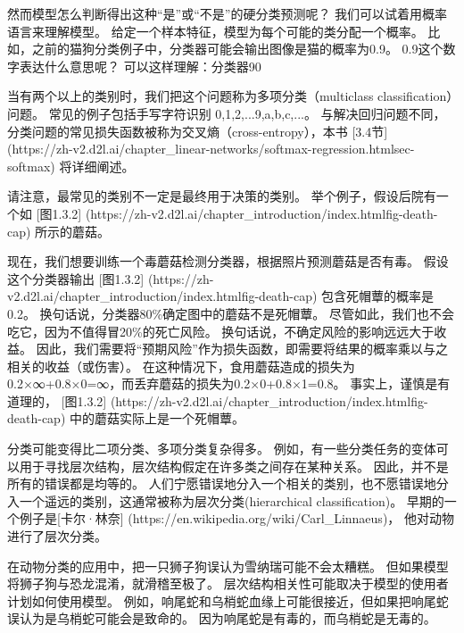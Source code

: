 然而模型怎么判断得出这种“是”或“不是”的硬分类预测呢？ 我们可以试着用概率语言来理解模型。 给定一个样本特征，模型为每个可能的类分配一个概率。 比如，之前的猫狗分类例子中，分类器可能会输出图像是猫的概率为0.9。 0.9这个数字表达什么意思呢？ 可以这样理解：分类器90%

当有两个以上的类别时，我们把这个问题称为多项分类（multiclass classification）问题。 常见的例子包括手写字符识别 {0,1,2,...9,a,b,c,...}。 与解决回归问题不同，分类问题的常见损失函数被称为交叉熵（cross-entropy），本书 [3.4节]
(https://zh-v2.d2l.ai/chapter\_linear-networks/softmax-regression.htmlsec-softmax) 
将详细阐述。

请注意，最常见的类别不一定是最终用于决策的类别。 举个例子，假设后院有一个如 [图1.3.2]
(https://zh-v2.d2l.ai/chapter\_introduction/index.htmlfig-death-cap) 
所示的蘑菇。



现在，我们想要训练一个毒蘑菇检测分类器，根据照片预测蘑菇是否有毒。 假设这个分类器输出 [图1.3.2]
(https://zh-v2.d2l.ai/chapter\_introduction/index.htmlfig-death-cap) 
包含死帽蕈的概率是0.2。 换句话说，分类器80\%确定图中的蘑菇不是死帽蕈。 尽管如此，我们也不会吃它，因为不值得冒20\%的死亡风险。 换句话说，不确定风险的影响远远大于收益。 因此，我们需要将“预期风险”作为损失函数，即需要将结果的概率乘以与之相关的收益（或伤害）。 在这种情况下，食用蘑菇造成的损失为0.2×∞+0.8×0=∞，而丢弃蘑菇的损失为0.2×0+0.8×1=0.8。 事实上，谨慎是有道理的， [图1.3.2]
(https://zh-v2.d2l.ai/chapter\_introduction/index.htmlfig-death-cap)
中的蘑菇实际上是一个死帽蕈。

分类可能变得比二项分类、多项分类复杂得多。 例如，有一些分类任务的变体可以用于寻找层次结构，层次结构假定在许多类之间存在某种关系。 因此，并不是所有的错误都是均等的。 人们宁愿错误地分入一个相关的类别，也不愿错误地分入一个遥远的类别，这通常被称为层次分类(hierarchical classification)。 早期的一个例子是[卡尔·林奈]
(https://en.wikipedia.org/wiki/Carl\_Linnaeus)，
他对动物进行了层次分类。

在动物分类的应用中，把一只狮子狗误认为雪纳瑞可能不会太糟糕。 但如果模型将狮子狗与恐龙混淆，就滑稽至极了。 层次结构相关性可能取决于模型的使用者计划如何使用模型。 例如，响尾蛇和乌梢蛇血缘上可能很接近，但如果把响尾蛇误认为是乌梢蛇可能会是致命的。 因为响尾蛇是有毒的，而乌梢蛇是无毒的。

